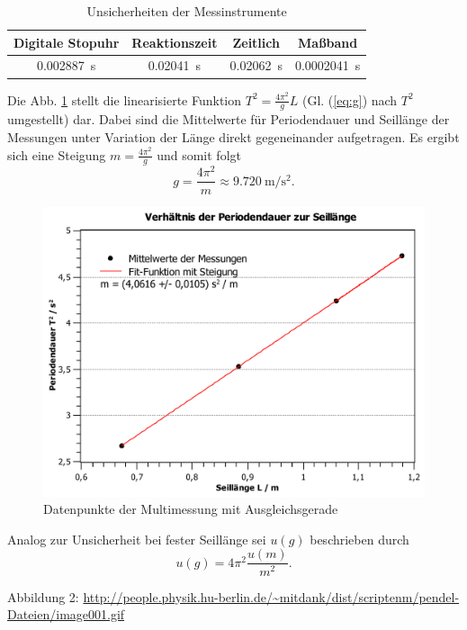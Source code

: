 \documentclass[11pt,a4paper,titlepage, ngerman]{article}
\begin{document}
			\begin{table}
			\centering
			\begin{tabular}{S|S|S||S}
				{Digitale Stopuhr} & {Reaktionszeit} & {Zeitlich} & {Maßband}\\
				\hline
				\SI{0,002887}{\second} & \SI{0,02041}{\second} & \SI{0,02062}{\second} & \SI{0,0002041}{\second}
			\end{tabular}
			\caption{Unsicherheiten der Messinstrumente}
			\label{tab:unsicherheiten}
			\end{table}
		
			Die Abb. \ref{fig:multi} stellt die linearisierte Funktion $T^2 = \frac{4 \pi^2}{g} L$ (Gl. (\ref{eq:g}) nach $T^2$ umgestellt) dar.
			Dabei sind die Mittelwerte für Periodendauer und Seillänge der Messungen unter Variation der Länge direkt gegeneinander aufgetragen.
			Es ergibt sich eine Steigung $m = \frac{4 \pi^2}{g}$ und somit folgt
			\begin{equation}
				g = \frac{4 \pi^2}{m} \approx \SI{9,720}{\meter\per\second\squared}.
			\end{equation}
			
			\begin{figure}
				\centering
				\includegraphics[scale=0.6]{SteigungMultimessung.pdf}
				\caption{Datenpunkte der Multimessung mit Ausgleichsgerade}
				\label{fig:multi}
			\end{figure}
		
			Analog zur Unsicherheit bei fester Seillänge sei $u(g)$ beschrieben durch
			\begin{equation*}
				u(g) = 4\pi^2 \frac{u(m)}{m^2}.
			\end{equation*}
		
		\newpage
		
		\begin{thebibliography}{9}		
			\item[Abbildung 2:] \url{http://people.physik.hu-berlin.de/~mitdank/dist/scriptenm/pendel-Dateien/image001.gif}			
		\end{thebibliography}	
			
\end{document}
